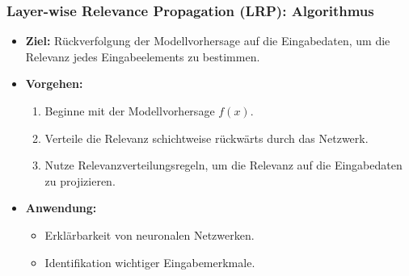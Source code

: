 \documentclass[aspectratio=1610, xcolor=dvipsnames, 9pt]{beamer}
\begin{document}
\begin{frame}
  \frametitle{Layer-wise Relevance Propagation (LRP): Algorithmus}
  \begin{itemize}
    \item \textbf{Ziel:} Rückverfolgung der Modellvorhersage auf die Eingabedaten, um die Relevanz jedes Eingabeelements zu bestimmen.
    \item \textbf{Vorgehen:}
    \begin{enumerate}
      \item Beginne mit der Modellvorhersage $f(x)$.
      \item Verteile die Relevanz schichtweise rückwärts durch das Netzwerk.
      \item Nutze Relevanzverteilungsregeln, um die Relevanz auf die Eingabedaten zu projizieren.
    \end{enumerate}
    \item \textbf{Anwendung:} 
    \begin{itemize}
      \item Erklärbarkeit von neuronalen Netzwerken.
      \item Identifikation wichtiger Eingabemerkmale.
    \end{itemize}
  \end{itemize}
\end{frame}
\end{document}
